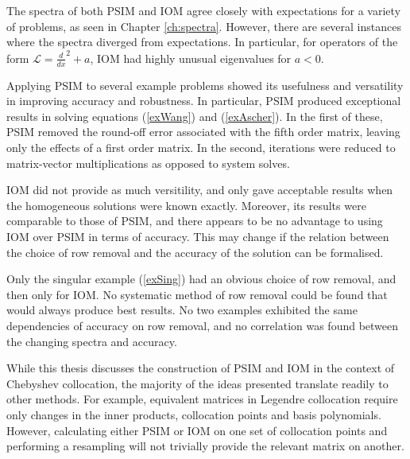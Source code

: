 \documentclass{sfuthesis}
\begin{document}
The spectra of both PSIM and IOM agree closely with expectations for a variety of problems, as seen in Chapter \ref{ch:spectra}.
However, there are several instances where the spectra diverged from expectations.
In particular, for operators of the form $\mathcal{L} = \frac{d}{dx}^2 + a$, IOM had highly unusual eigenvalues for $a<0$.

Applying PSIM to several example problems showed its usefulness and versatility in improving accuracy and robustness.
In particular, PSIM produced exceptional results in solving equations (\ref{exWang}) and (\ref{exAscher}).
In the first of these, PSIM removed the round-off error associated with the fifth order matrix, leaving only the effects of a first order matrix.
In the second, iterations were reduced to matrix-vector multiplications as opposed to system solves.

IOM did not provide as much versitility, and only gave acceptable results when the homogeneous solutions were known exactly.
Moreover, its results were comparable to those of PSIM, and there appears to be no advantage to using IOM over PSIM in terms of accuracy.
This may change if the relation between the choice of row removal and the accuracy of the solution can be formalised.

Only the singular example (\ref{exSing}) had an obvious choice of row removal, and then only for IOM.
No systematic method of row removal could be found that would always produce best results.
No two examples exhibited the same dependencies of accuracy on row removal, and no correlation was found between the changing spectra and accuracy.

While this thesis discusses the construction of PSIM and IOM in the context of Chebyshev collocation,
the majority of the ideas presented translate readily to other methods.
For example, equivalent matrices in Legendre collocation require only changes in the inner products, collocation points and basis polynomials.
However, calculating either PSIM or IOM on one set of collocation points and performing a resampling will not trivially provide the relevant matrix on another.

%
%
%
%
%
\end{document}
